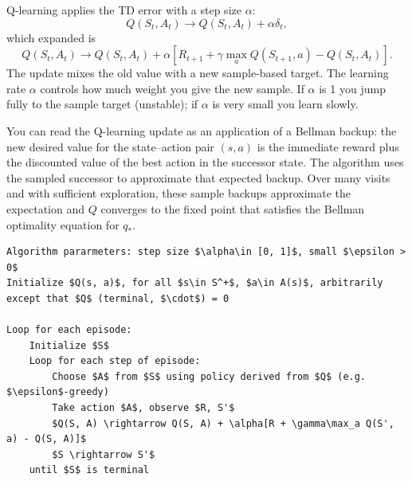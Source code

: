 Q-learning applies the TD error with a step size $\alpha$:
\begin{equation*}
    Q(S_t,A_t)\rightarrow Q(S_t,A_t)+\alpha \delta_t,    
\end{equation*}
which expanded is
\begin{equation*}
    Q(S_t,A_t)\rightarrow Q(S_t,A_t)+\alpha[R_{t+1}+\gamma\max_aQ(S_{t+1},a) - Q(S_t,A_t)].
\end{equation*}
The update mixes the old value with a new sample-based target. The learning rate $\alpha$ controls how much weight you give the new sample. If 
$\alpha$ is 1 you jump fully to the sample target (unstable); if $\alpha$ is very small you learn slowly. 

You can read the Q-learning update as an application of a Bellman backup: the new desired value for the state–action pair $(s,a)$ is the immediate reward plus the discounted value of the best action in the successor state. The algorithm uses the sampled successor to approximate that expected backup. Over many visits and with sufficient exploration, these sample backups approximate the expectation and $Q$ converges to the fixed point that satisfies the Bellman optimality equation for $q_*$.

\begin{lstlisting}[mathescape]
Algorithm pararmeters: step size $\alpha\in [0, 1]$, small $\epsilon > 0$
Initialize $Q(s, a)$, for all $s\in S^+$, $a\in A(s)$, arbitrarily except that $Q$ (terminal, $\cdot$) = 0

Loop for each episode:
    Initialize $S$
    Loop for each step of episode:
        Choose $A$ from $S$ using policy derived from $Q$ (e.g. $\epsilon$-greedy)
        Take action $A$, observe $R, S'$
        $Q(S, A) \rightarrow Q(S, A) + \alpha[R + \gamma\max_a Q(S', a) - Q(S, A)]$
        $S \rightarrow S'$
    until $S$ is terminal
\end{lstlisting}
